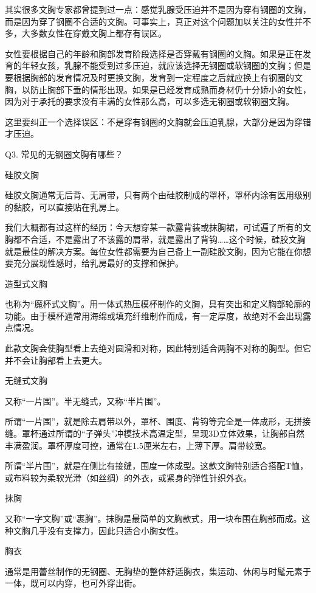 \documentclass[12pt,UTF8]{ctexbook}
\begin{document}
其实很多文胸专家都曾提到过一点：感觉乳腺受压迫并不是因为穿有钢圈的文胸，而是因为穿了钢圈不合适的文胸。可事实上，真正对这个问题加以关注的女性并不多，大多数女性在穿戴文胸上都存有误区。

女性要根据自己的年龄和胸部发育阶段选择是否穿戴有钢圈的文胸。如果是正在发育的年轻女孩，乳腺不能受到过多压迫，就应该选择无钢圈或软钢圈的文胸；但是要根据胸部的发育情况及时更换文胸，发育到一定程度之后就应换上有钢圈的文胸，以防止胸部下垂的情形出现。如果是已经发育成熟而身材仍十分娇小的女性，因为对于承托的要求没有丰满的女性那么高，可以多选无钢圈或软钢圈文胸。

这里要纠正一个选择误区：不是穿有钢圈的文胸就会压迫乳腺，大部分是因为穿错才压迫。

Q3. 常见的无钢圈文胸有哪些？

硅胶文胸

硅胶文胸通常无后背、无肩带，只有两个由硅胶制成的罩杯，罩杯内涂有医用级别的黏胶，可以直接贴在乳房上。

我们大概都有过这样的经历：今天想穿某一款露背装或抹胸裙，可试遍了所有的文胸都不合适，不是露出了不该露的肩带，就是露出了背钩……这个时候，硅胶文胸就是最佳的解决方案。每位女性都需要为自己备上一副硅胶文胸，因为它能在你想要充分展现性感时，给乳房最好的支撑和保护。

造型式文胸

也称为“魔杯式文胸”。用一体式热压模杯制作的文胸，具有突出和定义胸部轮廓的功能。由于模杯通常用海绵或填充纤维制作而成，有一定厚度，故绝对不会出现露点情况。

此款文胸会使胸型看上去绝对圆滑和对称，因此特别适合两胸不对称的胸型。但它并不会让胸部看上去更大。

无缝式文胸

又称“一片围”。半无缝式，又称“半片围”。

所谓“一片围”，就是除去肩带以外，罩杯、围度、背钩等完全是一体成形，无拼接缝。罩杯通过所谓的“子弹头”冲模技术高温定型，呈现3D立体效果，让胸部自然丰满盈润。罩杯厚度可控，通常在1.5厘米左右，上薄下厚。肩带较宽。

所谓“半片围”，就是在侧比有接缝，围度一体成型。这款文胸特别适合搭配T恤，或布料较为柔软光滑（如丝绸）的外衣，或紧身的弹性针织外衣。

抹胸

又称“一字文胸”或“裹胸”。抹胸是最简单的文胸款式，用一块布围在胸部而成。这种文胸几乎没有支撑力，因此只适合小胸女性。

胸衣

通常是用蕾丝制作的无钢圈、无胸垫的整体舒适胸衣，集运动、休闲与时髦元素于一体，既可以内穿，也可外穿出街。
\end{document}
